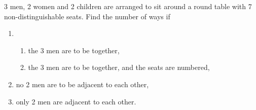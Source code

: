 \begin{problem}
    3 men, 2 women and 2 children are arranged to sit around a round table with 7 non-distinguishable seats. Find the number of ways if
    \begin{enumerate}
        \item \begin{enumerate}
            \item the 3 men are to be together,
            \item the 3 men are to be together, and the seats are numbered,
        \end{enumerate}
        \item no 2 men are to be adjacent to each other,
        \item only 2 men are adjacent to each other.
    \end{enumerate}
\end{problem}
